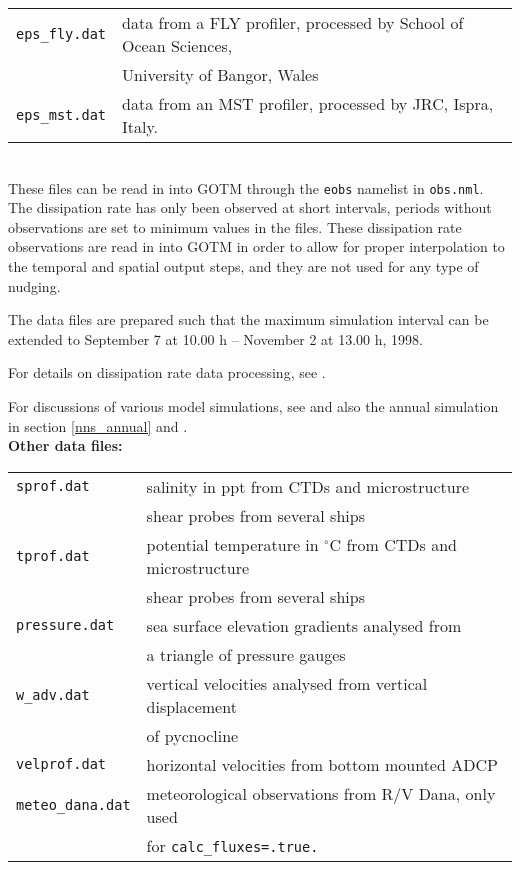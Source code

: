 \begin{tabular}{ll}
{\tt eps\_fly.dat}& data from a FLY profiler, processed by School
of Ocean Sciences, \\ & University of Bangor, Wales \\  
{\tt eps\_mst.dat}& data from an MST profiler, processed by JRC, Ispra, Italy. 
\end{tabular}
\\

These files can be read in into GOTM through the {\tt eobs} namelist in
{\tt obs.nml}.  The dissipation rate has only been observed at 
short intervals, periods without observations are set to minimum 
values in the files. These dissipation rate observations are read in
into GOTM in order to allow for proper interpolation to the temporal 
and spatial
output steps, and they are not used for any type of nudging.

The data files are prepared such that the maximum simulation
interval can be extended to September 7 at 10.00 h -- 
November 2 at 13.00 h, 1998. 

For details on dissipation rate data processing, see \cite{Prandkeetal2000}.

For discussions of various model simulations, see \cite{Burchardetal2002}
and also the annual simulation in section \ref{nns_annual} and
\cite{Boldingetal2002}.
\\ 

{\bf Other data files:}

\begin{tabular}{ll}
{\tt sprof.dat} &  salinity in ppt from CTDs and microstructure \\ & 
shear probes from several ships\\
{\tt tprof.dat} &  potential temperature in $^{\circ}$C from CTDs and microstructure \\ &
shear probes from several ships\\
{\tt pressure.dat} & sea surface elevation gradients analysed from \\
                   & a triangle of pressure gauges \\
{\tt w\_adv.dat} & vertical velocities analysed from vertical displacement 
\\ & of pycnocline \\
{\tt velprof.dat} &  horizontal velocities from bottom mounted ADCP \\
{\tt meteo\_dana.dat} & meteorological observations from R/V Dana, only used 
\\ & for {\tt calc\_fluxes=.true.}\\
\end{tabular}


